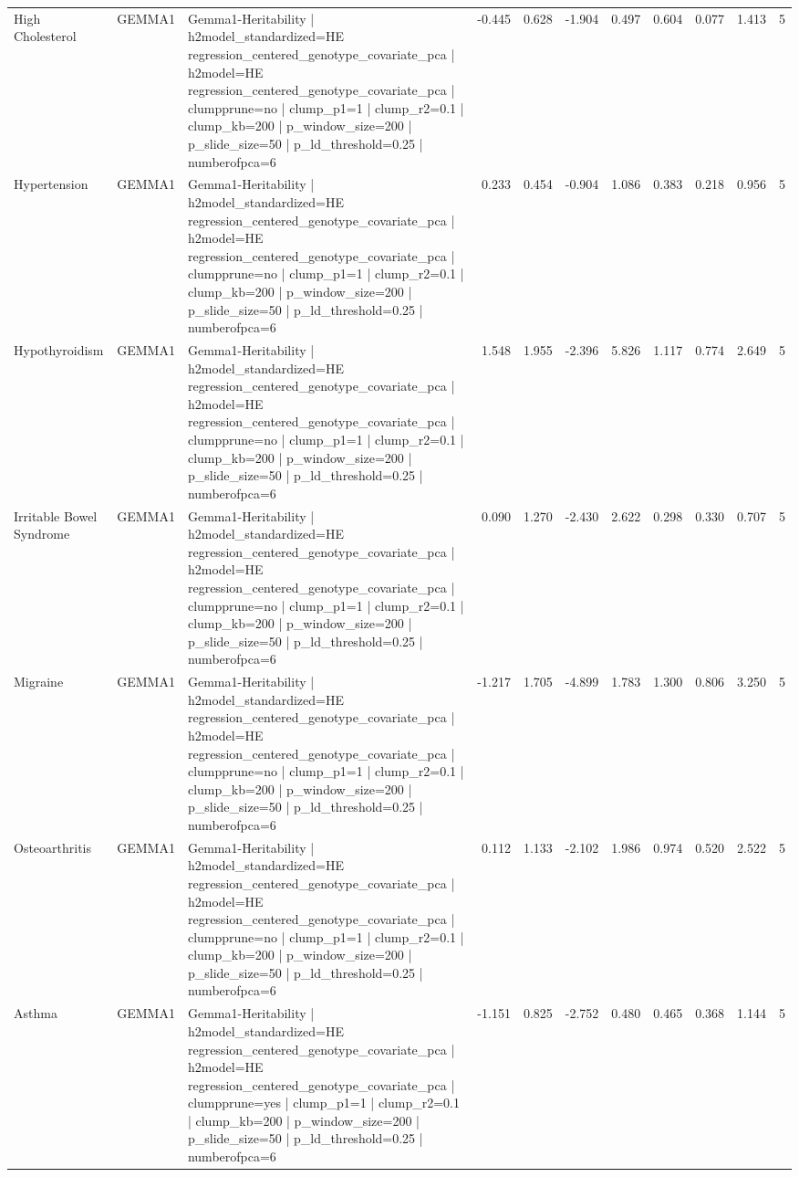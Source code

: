 \begin{landscape}
\begin{longtable}{p{2.4cm}p{1.8cm}p{6.0cm}rrrrrrrr}
High Cholesterol & GEMMA1 & Gemma1-Heritability | h2model\_standardized=HE regression\_centered\_genotype\_covariate\_pca | h2model=HE regression\_centered\_genotype\_covariate\_pca | clumpprune=no | clump\_p1=1 | clump\_r2=0.1 | clump\_kb=200 | p\_window\_size=200 | p\_slide\_size=50 | p\_ld\_threshold=0.25 | numberofpca=6 & -0.445 & 0.628 & -1.904 & 0.497 & 0.604 & 0.077 & 1.413 & 5 \\
Hypertension & GEMMA1 & Gemma1-Heritability | h2model\_standardized=HE regression\_centered\_genotype\_covariate\_pca | h2model=HE regression\_centered\_genotype\_covariate\_pca | clumpprune=no | clump\_p1=1 | clump\_r2=0.1 | clump\_kb=200 | p\_window\_size=200 | p\_slide\_size=50 | p\_ld\_threshold=0.25 | numberofpca=6 & 0.233 & 0.454 & -0.904 & 1.086 & 0.383 & 0.218 & 0.956 & 5 \\
Hypothyroidism & GEMMA1 & Gemma1-Heritability | h2model\_standardized=HE regression\_centered\_genotype\_covariate\_pca | h2model=HE regression\_centered\_genotype\_covariate\_pca | clumpprune=no | clump\_p1=1 | clump\_r2=0.1 | clump\_kb=200 | p\_window\_size=200 | p\_slide\_size=50 | p\_ld\_threshold=0.25 | numberofpca=6 & 1.548 & 1.955 & -2.396 & 5.826 & 1.117 & 0.774 & 2.649 & 5 \\
Irritable Bowel Syndrome & GEMMA1 & Gemma1-Heritability | h2model\_standardized=HE regression\_centered\_genotype\_covariate\_pca | h2model=HE regression\_centered\_genotype\_covariate\_pca | clumpprune=no | clump\_p1=1 | clump\_r2=0.1 | clump\_kb=200 | p\_window\_size=200 | p\_slide\_size=50 | p\_ld\_threshold=0.25 | numberofpca=6 & 0.090 & 1.270 & -2.430 & 2.622 & 0.298 & 0.330 & 0.707 & 5 \\
Migraine & GEMMA1 & Gemma1-Heritability | h2model\_standardized=HE regression\_centered\_genotype\_covariate\_pca | h2model=HE regression\_centered\_genotype\_covariate\_pca | clumpprune=no | clump\_p1=1 | clump\_r2=0.1 | clump\_kb=200 | p\_window\_size=200 | p\_slide\_size=50 | p\_ld\_threshold=0.25 | numberofpca=6 & -1.217 & 1.705 & -4.899 & 1.783 & 1.300 & 0.806 & 3.250 & 5 \\
Osteoarthritis & GEMMA1 & Gemma1-Heritability | h2model\_standardized=HE regression\_centered\_genotype\_covariate\_pca | h2model=HE regression\_centered\_genotype\_covariate\_pca | clumpprune=no | clump\_p1=1 | clump\_r2=0.1 | clump\_kb=200 | p\_window\_size=200 | p\_slide\_size=50 | p\_ld\_threshold=0.25 | numberofpca=6 & 0.112 & 1.133 & -2.102 & 1.986 & 0.974 & 0.520 & 2.522 & 5 \\
Asthma & GEMMA1 & Gemma1-Heritability | h2model\_standardized=HE regression\_centered\_genotype\_covariate\_pca | h2model=HE regression\_centered\_genotype\_covariate\_pca | clumpprune=yes | clump\_p1=1 | clump\_r2=0.1 | clump\_kb=200 | p\_window\_size=200 | p\_slide\_size=50 | p\_ld\_threshold=0.25 | numberofpca=6 & -1.151 & 0.825 & -2.752 & 0.480 & 0.465 & 0.368 & 1.144 & 5 \\

\end{longtable}
\end{landscape}
